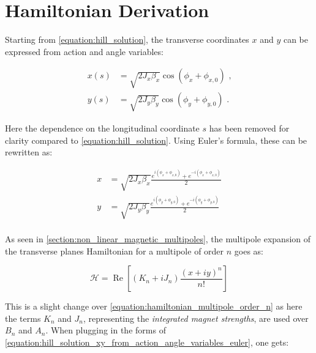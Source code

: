 \section{Hamiltonian Derivation}

Starting from \cref{equation:hill_solution}, the transverse coordinates \(x\) and \(y\) can be expressed from action and angle variables:

\begin{equation}
    \begin{aligned}
        x(s) &= \sqrt{2 J_x \beta_x} \cos \left( \phi_x + \phi_{x,0} \right) \text{ ,} \\
        y(s) &= \sqrt{2 J_y \beta_y} \cos \left( \phi_y + \phi_{y,0} \right) \text{ .}
    \end{aligned}
    \label{equation:hill_solution_xy_from_action_angle_variables}
\end{equation}

Here the dependence on the longitudinal coordinate \(s\) has been removed for clarity compared to \cref{equation:hill_solution}.
Using Euler's formula, these can be rewritten as:

\begin{equation}
    \begin{aligned}
        x &= \sqrt{2 J_x \beta_x} \frac{e^{i \left( \phi_x + \phi_{x,0} \right)} + e^{-i \left( \phi_x + \phi_{x,0} \right)}}{2} \\
        y &= \sqrt{2 J_y \beta_y} \frac{e^{i \left( \phi_y + \phi_{y,0} \right)} + e^{-i \left( \phi_y + \phi_{y,0} \right)}}{2} \\
    \end{aligned}
    \label{equation:hill_solution_xy_from_action_angle_variables_euler}
\end{equation}

As seen in \cref{section:non_linear_magnetic_multipoles}, the multipole expansion of the transverse planes Hamiltonian for a multipole of order \(n\) goes as:

\begin{equation}
    \mathcal{H} = \operatorname{Re} \left[ (K_n + i J_n) \frac{(x + i y)^n}{n!} \right]
\end{equation}

This is a slight change over \cref{equation:hamiltonian_multipole_order_n} as here the terms \(K_n\) and \(J_n\), representing the \emph{integrated magnet strengths}, are used over \(B_n\) and \(A_n\).
When plugging in the forms of \cref{equation:hill_solution_xy_from_action_angle_variables_euler}, one gets:

